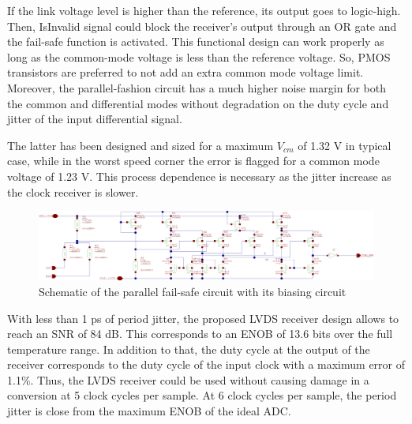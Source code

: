 If the link voltage level is higher than the reference, its output goes to logic-high. Then, IsInvalid signal could block the receiver's output through an OR gate and the fail-safe function is activated. This functional design can work properly as long as the common-mode voltage is less than the reference voltage. So, PMOS transistors are preferred to not add an extra common mode voltage limit. Moreover, the parallel-fashion circuit has a much higher noise margin for both the common and differential modes without degradation on the duty cycle and jitter of the input differential signal.

The latter has been designed and sized for a maximum $V_{cm}$ of 1.32 V in typical case, while in the worst speed corner the error is flagged for a common mode voltage of 1.23 V. This process dependence is necessary as the jitter increase as the clock receiver is slower.

\begin{figure}[htp]
    \centering
    \includegraphics[width=\textwidth]{Chapter5/Figs/adc_chip/lvds-failsafe.png}
    \caption{Schematic of the parallel fail-safe circuit with its biasing circuit}
    \label{}
\end{figure}

With less than 1 ps of period jitter, the proposed LVDS receiver design allows to reach an SNR of 84 dB. This corresponds to an ENOB of 13.6 bits over the full temperature range. In addition to that, the duty cycle at the output of the receiver corresponds to the duty cycle of the input clock with a maximum error of 1.1\%. Thus, the LVDS receiver could be used without causing damage in a conversion at 5 clock cycles per sample. At 6 clock cycles per sample, the period jitter is close from the maximum ENOB of the ideal ADC\@.

